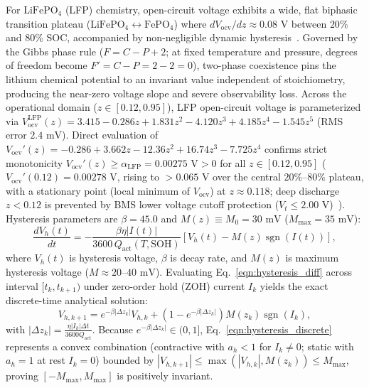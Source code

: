 \documentclass[balance,nocopyright,upint,varvw,hyphenate,barcolor=NavyBlue,nolists]{asmejour}
\begin{document}
For $\text{LiFePO}_4$ (LFP) chemistry, open-circuit voltage exhibits a wide, flat biphasic transition plateau ($\text{LiFePO}_4 \leftrightarrow \text{FePO}_4$) where $d V_{\text{ocv}} / dz \approx 0.08\text{ V}$ between $20\%$ and $80\%$ SOC, accompanied by non-negligible dynamic hysteresis~\cite{Roscher2011hysteresis,Verbrugge2004hysteresis}. Governed by the Gibbs phase rule ($F = C - P + 2$; at fixed temperature and pressure, degrees of freedom become $F' = C - P = 2 - 2 = 0$), two-phase coexistence pins the lithium chemical potential to an invariant value independent of stoichiometry, producing the near-zero voltage slope and severe observability loss. Across the operational domain ($z \in [0.12, 0.95]$), LFP open-circuit voltage is parameterized via $V_{\text{ocv}}^{\text{LFP}}(z) = 3.415 - 0.286z + 1.831z^2 - 4.120z^3 + 4.185z^4 - 1.545z^5$ (RMS error $2.4\text{ mV}$). Direct evaluation of $V_{\text{ocv}}'(z) = -0.286 + 3.662z - 12.36z^2 + 16.74z^3 - 7.725z^4$ confirms strict monotonicity $V_{\text{ocv}}'(z) \ge \alpha_{\text{LFP}} = 0.00275\text{ V} > 0$ for all $z \in [0.12, 0.95]$ ($V_{\text{ocv}}'(0.12) = 0.00278\text{ V}$, rising to $>0.065\text{ V}$ over the central $20\%\text{--}80\%$ plateau, with a stationary point (local minimum of $V_{\text{ocv}}$) at $z \approx 0.118$; deep discharge $z < 0.12$ is prevented by BMS lower voltage cutoff protection ($V_t \le 2.00\text{ V}$)~\cite{He2011ecm}). Hysteresis parameters are $\beta = 45.0$ and $M(z) \equiv M_0 = 30\text{ mV}$ ($M_{\max} = 35\text{ mV}$):
\begin{equation}\label{eqn:hysteresis_diff}
\frac{d V_h(t)}{dt} = -\frac{\beta \eta |I(t)|}{3600\,Q_{\text{act}}(T, \text{SOH})} \left[ V_h(t) - M(z) \operatorname{sgn}(I(t)) \right],
\end{equation}
where $V_h(t)$ is hysteresis voltage, $\beta$ is decay rate, and $M(z)$ is maximum hysteresis voltage ($M \approx 20\text{--}40\text{ mV}$). Evaluating Eq.~\eqref{eqn:hysteresis_diff} across interval $[t_k, t_{k+1})$ under zero-order hold (ZOH) current $I_k$ yields the exact discrete-time analytical solution:
\begin{equation}\label{eqn:hysteresis_discrete}
V_{h,k+1} = e^{-\beta |\Delta z_k|} V_{h,k} + \left(1 - e^{-\beta |\Delta z_k|}\right) M(z_k) \operatorname{sgn}(I_k),
\end{equation}
with $|\Delta z_k| = \frac{\eta |I_k| \Delta t}{3600 Q_{\text{act}}}$. Because $e^{-\beta |\Delta z_k|} \in (0, 1]$, Eq.~\eqref{eqn:hysteresis_discrete} represents a convex combination (contractive with $a_h < 1$ for $I_k \ne 0$; static with $a_h = 1$ at rest $I_k = 0$) bounded by $|V_{h,k+1}| \le \max(|V_{h,k}|, M(z_k)) \le M_{\max}$, proving $[-M_{\max}, M_{\max}]$ is positively invariant.
\end{document}

